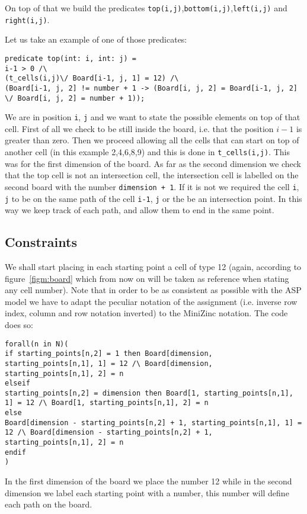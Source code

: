 On top of that we build the predicates \texttt{top(i,j)},\texttt{bottom(i,j)},\texttt{left(i,j)} and \texttt{right(i,j)}.

Let us take an example of one of those predicates:
\begin{verbatim}
predicate top(int: i, int: j) =
i-1 > 0 /\ 
(t_cells(i,j)\/ Board[i-1, j, 1] = 12) /\ 
(Board[i-1, j, 2] != number + 1 -> (Board[i, j, 2] = Board[i-1, j, 2]  \/ Board[i, j, 2] = number + 1));
\end{verbatim}
We are in position \texttt{i}, \texttt{j} and we want to state the possible elements on top of that cell. First of all we check to be still inside the board, i.e. that the position $i-1$ is greater than zero. Then we proceed allowing all the cells that can start on top of another cell (in this example 2,4,6,8,9) and this is done in \texttt{t_cells(i,j)}. This was for the first dimension of the board. As far as the second dimension we check that the top cell is not an intersection cell, the intersection cell is labelled on the second board with the number \texttt{dimension + 1}. If it is not we required the cell \texttt{i}, \texttt{j} to be on the same path of the cell \texttt{i-1}, \texttt{j} or the be an intersection point. In this way we keep track of each path, and allow them to end in the same point.

\subsection{Constraints}
We shall start placing in each starting point a cell of type 12 (again, according to figure~\ref{figm:board} which from now on will be taken as reference when stating any cell number). Note that in order to be as consistent as possible with the ASP model we have to adapt the peculiar notation of the assignment (i.e. inverse row index, column and row notation inverted) to the MiniZinc notation. The code does so:

\begin{verbatim}
forall(n in N)(
if starting_points[n,2] = 1 then Board[dimension, starting_points[n,1], 1] = 12 /\ Board[dimension, starting_points[n,1], 2] = n
elseif
starting_points[n,2] = dimension then Board[1, starting_points[n,1], 1] = 12 /\ Board[1, starting_points[n,1], 2] = n
else
Board[dimension - starting_points[n,2] + 1, starting_points[n,1], 1] = 12 /\ Board[dimension - starting_points[n,2] + 1, starting_points[n,1], 2] = n
endif
)
\end{verbatim}
In the first dimension of the board we place the number 12 while in the second dimension we label each starting point with a number, this number will define each path on the board.

